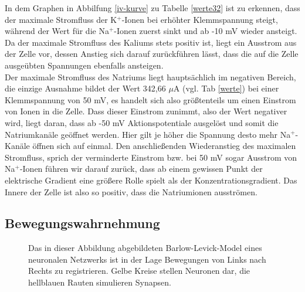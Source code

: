 \documentclass[11pt]{article}
\begin{document}
In dem Graphen in Abbilfung \ref{iv-kurve} zu Tabelle \ref{werte32} ist zu erkennen, dass der maximale Stromfluss der K$^+$-Ionen bei erhöhter Klemmspannung steigt, während der Wert für die Na$^+$-Ionen zuerst sinkt und ab -10 mV wieder ansteigt. Da der maximale Stromfluss des Kaliums stets positiv ist, liegt ein Ausstrom aus der Zelle vor, dessen Anstieg sich darauf zurückführen lässt, dass die auf die Zelle ausgeübten Spannungen ebenfalls ansteigen.\\
Der maximale Stromfluss des Natriums liegt hauptsächlich im negativen Bereich, die einzige Ausnahme bildet der Wert 342,66 $\mu$A  (vgl. Tab \ref{werte}) bei einer Klemmspannung von 50 mV, es handelt sich also größtenteils um einen Einstrom von Ionen in die Zelle. Dass dieser Einstrom zunimmt, also der Wert negativer wird, liegt daran, dass ab -50 mV Aktionspotentiale ausgelöst und somit die Natriumkanäle geöffnet werden. Hier gilt je höher die Spannung desto mehr Na$^+$-Kanäle öffnen sich auf einmal. Den anschließenden Wiederanstieg des maximalen Stromfluss, sprich der verminderte Einstrom bzw. bei 50 mV sogar Ausstrom von Na$^+$-Ionen führen wir darauf zurück, dass ab einem gewissen Punkt der elektrische Gradient eine größere Rolle spielt als der Konzentrationsgradient. Das Innere der Zelle ist also so positiv, dass die Natriumionen ausströmen.

\subsection{Bewegungswahrnehmung}
\begin{figure}[H]
\caption{Das in dieser Abbildung abgebildeten Barlow-Levick-Model eines neuronalen Netzwerks ist in der Lage Bewegungen von Links nach Rechts zu registrieren. Gelbe Kreise stellen Neuronen dar, die hellblauen Rauten simulieren Synapsen.}
\label{bar-lev}
\end{figure}
\end{document}
